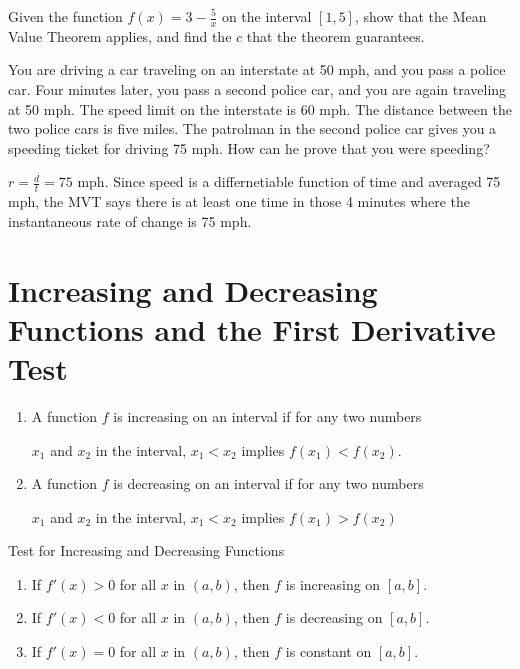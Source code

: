 \documentclass[../bccalc.tex]{subfiles}
\begin{document}
\ex Given the function $f(x)=3-\frac{5}{x}$ on the interval $[1,5]$, show that the Mean Value Theorem applies, and find the $c$ that the theorem guarantees.

\begin{example}
    You are driving a car traveling on an interstate at 50 mph, and you pass a police car. Four minutes later, you pass a second police car, and you are again traveling at 50 mph.
    The speed limit on the interstate is 60 mph. The distance between the two police cars is five miles. The patrolman in the second police car gives you a speeding ticket for driving 75 mph. How can he prove that you were speeding?

    $r=\frac{d}{t}=75$ mph. Since speed is a differnetiable function of time and averaged 75 mph, the MVT says there is at least one time in those 4 minutes where the instantaneous rate of change is 75 mph.
\end{example}

\section{Increasing and Decreasing Functions and the First Derivative Test}
\begin{definition}
    \begin{enumerate}
        \item A function $f$ is increasing on an interval if for any two numbers 
        
        $x_1$ and $x_2$ in the interval, $x_1<x_2$ implies $f(x_1)<f(x_2)$.

        \item A function $f$ is decreasing on an interval if for any two numbers 
        
        $x_1$ and $x_2$ in the interval, $x_1<x_2$ implies $f(x_1)>f(x_2)$
    \end{enumerate}
\end{definition}

Test for Increasing and Decreasing Functions 
\begin{enumerate}
    \item If $f'(x)>0$ for all $x$ in $(a,b)$, then $f$ is increasing on $[a,b]$.
    \item If $f'(x)<0$ for all $x$ in $(a,b)$, then $f$ is decreasing on $[a,b]$.
    \item If $f'(x)=0$ for all $x$ in $(a,b)$, then $f$ is constant on $[a,b]$.
\end{enumerate}
\end{document}
